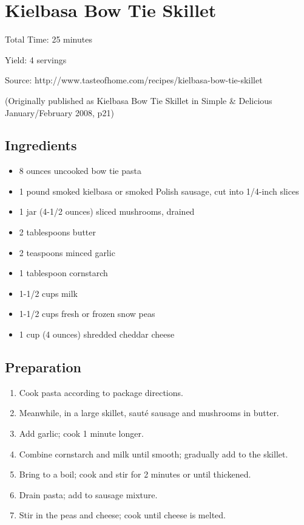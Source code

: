 \section{Kielbasa Bow Tie Skillet}

\begin{center}
\noindent Total Time: 25 minutes

\noindent Yield: 4 servings

\vspace{1em}

Source: http://www.tasteofhome.com/recipes/kielbasa-bow-tie-skillet

\noindent(Originally published as Kielbasa Bow Tie Skillet in Simple \& Delicious January/February 2008, p21)
\end{center}

\subsection{Ingredients}
\begin{multicols}{2}
\begin{itemize}
    \item 8 ounces uncooked bow tie pasta
    \item 1 pound smoked kielbasa or smoked Polish sausage, cut into 1/4-inch slices
    \item 1 jar (4-1/2 ounces) sliced mushrooms, drained
    \item 2 tablespoons butter
    \item 2 teaspoons minced garlic
    \item 1 tablespoon cornstarch
    \item 1-1/2 cups milk
    \item 1-1/2 cups fresh or frozen snow peas
    \item 1 cup (4 ounces) shredded cheddar cheese
\end{itemize}
\end{multicols}

\subsection{Preparation}
\begin{enumerate}
    \item Cook pasta according to package directions.
    \item Meanwhile, in a large skillet, saut\'{e} sausage and mushrooms in butter.
    \item Add garlic; cook 1 minute longer.
    \item Combine cornstarch and milk until smooth; gradually add to the skillet.
    \item Bring to a boil; cook and stir for 2 minutes or until thickened.
    \item Drain pasta; add to sausage mixture.
    \item Stir in the peas and cheese; cook until cheese is melted.
\end{enumerate}


